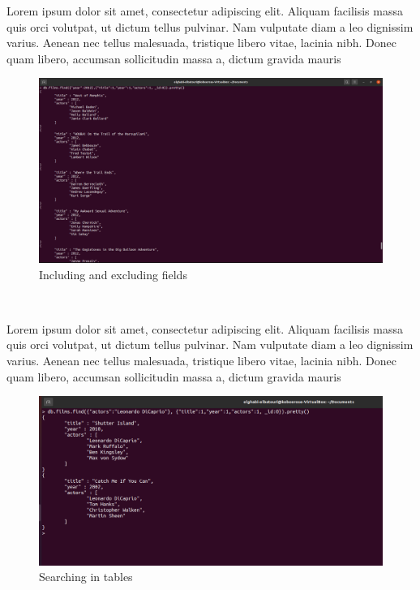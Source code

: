 \begin{spacing}{1.2}
\par Lorem ipsum dolor sit amet, consectetur adipiscing elit. Aliquam facilisis massa quis orci volutpat, ut dictum tellus pulvinar. Nam vulputate diam a leo dignissim varius. Aenean nec tellus malesuada, tristique libero vitae, lacinia nibh. Donec quam libero, accumsan sollicitudin massa a, dictum gravida mauris
\\
\begin{figure}[!htb] 
\begin{center} 
\includegraphics[width=1\linewidth]{Pictures/MongoDB/Examining MongoDB Query Features/Document search/Including and excluding fields} 
\end{center} 
\caption{Including and excluding fields} 
\end{figure}  \FloatBarrier
\\

\par Lorem ipsum dolor sit amet, consectetur adipiscing elit. Aliquam facilisis massa quis orci volutpat, ut dictum tellus pulvinar. Nam vulputate diam a leo dignissim varius. Aenean nec tellus malesuada, tristique libero vitae, lacinia nibh. Donec quam libero, accumsan sollicitudin massa a, dictum gravida mauris
\\
\begin{figure}[!htb] 
\begin{center} 
\includegraphics[width=1\linewidth]{Pictures/MongoDB/Examining MongoDB Query Features/Document search/Searching in tables} 
\end{center} 
\caption{Searching in tables} 
\end{figure}  \FloatBarrier
\\


\end{spacing}
